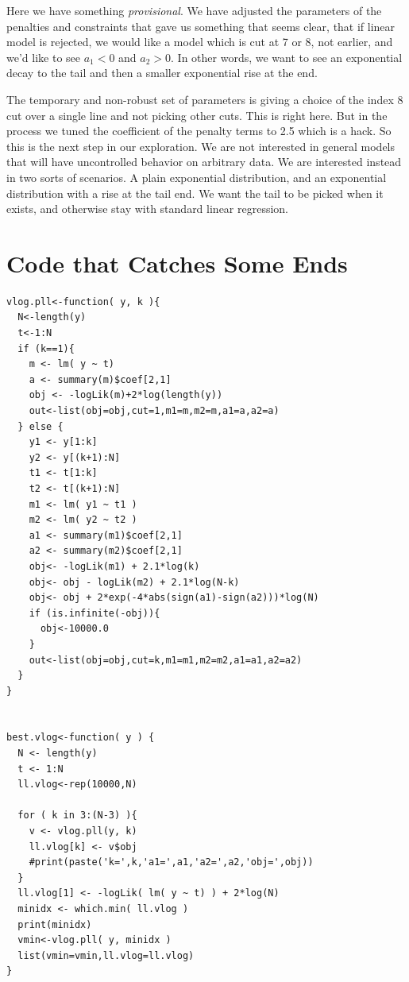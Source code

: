 \documentclass{amsart}
\begin{document}
Here we have something {\em provisional}.  We have adjusted the parameters of the penalties and constraints that gave us something that seems clear, that if linear model is rejected, we would like a model which is cut at 7 or 8, not earlier, and we'd like to see $a_1<0$ and $a_2>0$.  In other words, we want to see an exponential decay to the tail and then a smaller exponential rise at the end.  

The temporary and non-robust set of parameters is giving a choice of the index 8 cut over a single line and not picking other cuts.  This is right here.  But in the process we tuned the coefficient of the penalty terms to 2.5 which is a hack.  So this is the next step in our exploration.  We are not interested in general models that will have uncontrolled behavior on arbitrary data.  We are interested instead in two sorts of scenarios.  A plain exponential distribution, and an exponential distribution with a rise at the tail end.  We want the tail to be picked when it exists, and otherwise stay with standard linear regression.


\section{Code that Catches Some Ends}

\begin{verbatim}
vlog.pll<-function( y, k ){
  N<-length(y)
  t<-1:N
  if (k==1){
    m <- lm( y ~ t)
    a <- summary(m)$coef[2,1]
    obj <- -logLik(m)+2*log(length(y))
    out<-list(obj=obj,cut=1,m1=m,m2=m,a1=a,a2=a)    
  } else {
    y1 <- y[1:k]
    y2 <- y[(k+1):N]
    t1 <- t[1:k]
    t2 <- t[(k+1):N]
    m1 <- lm( y1 ~ t1 )
    m2 <- lm( y2 ~ t2 )
    a1 <- summary(m1)$coef[2,1]
    a2 <- summary(m2)$coef[2,1]
    obj<- -logLik(m1) + 2.1*log(k)
    obj<- obj - logLik(m2) + 2.1*log(N-k)
    obj<- obj + 2*exp(-4*abs(sign(a1)-sign(a2)))*log(N)
    if (is.infinite(-obj)){
      obj<-10000.0
    }
    out<-list(obj=obj,cut=k,m1=m1,m2=m2,a1=a1,a2=a2)    
  }
}


best.vlog<-function( y ) {
  N <- length(y)
  t <- 1:N
  ll.vlog<-rep(10000,N)
  
  for ( k in 3:(N-3) ){
    v <- vlog.pll(y, k)
    ll.vlog[k] <- v$obj
    #print(paste('k=',k,'a1=',a1,'a2=',a2,'obj=',obj))
  }
  ll.vlog[1] <- -logLik( lm( y ~ t) ) + 2*log(N)
  minidx <- which.min( ll.vlog )
  print(minidx)
  vmin<-vlog.pll( y, minidx )
  list(vmin=vmin,ll.vlog=ll.vlog)
}
\end{verbatim}
\end{document}
